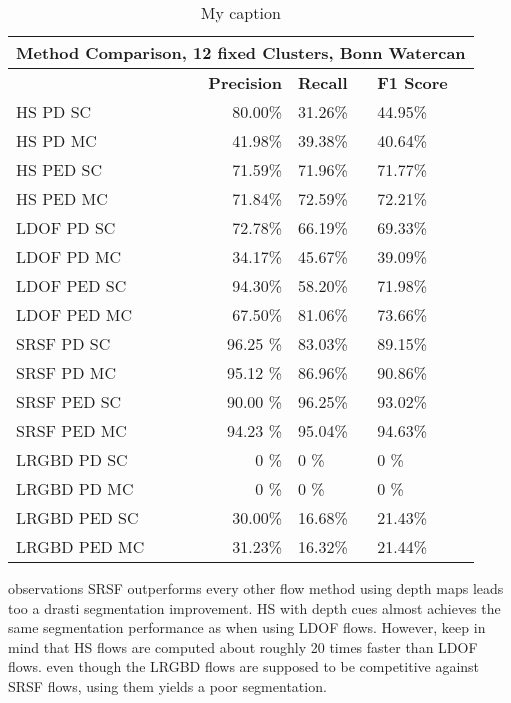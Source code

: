 \begin{table}[]
\centering
\begin{tabular}{|l|r|l|l|}
\hline
\multicolumn{4}{|c|}{Method Comparison, 12 fixed Clusters, Bonn Watercan}                        \\ \hline
              & \textbf{Precision} & \textbf{Recall} & \textbf{F1 Score} \\ \hline
HS PD SC  & 80.00\%   & 31.26\%     & 44.95\%  \\ \hline
HS PD MC  & 41.98\%   & 39.38\%     & 40.64\%  \\ \hline              
HS PED SC  & 71.59\%   & 71.96\%     & 71.77\%  \\ \hline
HS PED MC  & 71.84\%   & 72.59\%     & 72.21\%  \\ \hline            
LDOF PD SC  & 72.78\%   & 66.19\%     & 69.33\%  \\ \hline
LDOF PD MC  & 34.17\%   & 45.67\%     & 39.09\%  \\ \hline              
LDOF PED SC  & 94.30\%   & 58.20\%     & 71.98\%  \\ \hline
LDOF PED MC  & 67.50\%   & 81.06\%     & 73.66\%  \\ \hline
SRSF PD SC & 96.25 \%   & 83.03\%     & 89.15\%  \\ \hline
SRSF PD MC & 95.12 \%   & 86.96\%     & 90.86\%  \\ \hline
SRSF PED SC & 90.00 \%   & 96.25\%     & 93.02\%  \\ \hline
SRSF PED MC & 94.23 \%   & 95.04\%     & 94.63\%  \\ \hline
LRGBD PD SC & 0 \%   & 0 \%     & 0 \%  \\ \hline
LRGBD PD MC & 0 \%   & 0 \%     & 0 \%  \\ \hline
LRGBD PED SC & 30.00\%   & 16.68\%     & 21.43\%  \\ \hline
LRGBD PED MC & 31.23\%   & 16.32\%     & 21.44\%  \\ \hline
\end{tabular}
\caption[Method Comparission Bonn Watercan]{My caption}
\label{tab:bonn_wc_methods}
\end{table}


observations
SRSF outperforms every other flow method
using depth maps leads too a drasti segmentation improvement.
HS with depth cues almost achieves the same segmentation performance as when using LDOF flows. However, keep in mind that HS flows are computed about roughly 20 times faster than LDOF flows.
even though the LRGBD flows are supposed to be competitive against SRSF flows, using them yields a poor segmentation.







